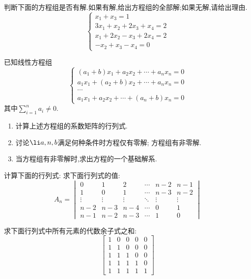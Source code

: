 \documentclass{ctexart}
\begin{document}
\pagestyle{empty}
\begin{center}
\end{center}
\begin{homework}[1(10')]
    判断下面的方程组是否有解.如果有解,给出方程组的全部解;如果无解,请给出理由.
    \[\left\{\begin{array}{l}
        x_1+x_3=1\\
        3x_1+x_2+2x_3+x_4=2\\
        x_1+2x_2-x_3+2x_4=2\\
        -x_2+x_3-x_4=0
    \end{array}\right.\]
\end{homework}
\begin{homework}[2(10')]
    已知线性方程组
    \[\left\{\begin{array}{c}
        \left(a_1+b\right)x_1+a_2x_2+\cdots+a_nx_n=0\\
        a_1x_1+\left(a_2+b\right)x_2+\cdots+a_nx_n=0\\
        \cdots\\
        a_1x_1+a_2x_2+\cdots+\left(a_n+b\right)x_n=0
    \end{array}\right.\]
    其中$\displaystyle\sum_{i=1}^{n}a_i\neq0$.
    \begin{enumerate}[label=\tbf{(\arabic*)},topsep=0pt,parsep=0pt,itemsep=0pt,partopsep=0pt]
        \item 计算上述方程组的系数矩阵的行列式.
        \item 讨论$\li a,n,b$满足何种条件时方程仅有零解; 方程组有非零解.
        \item 当方程组有非零解时,求出方程的一个基础解系.
    \end{enumerate}
\end{homework}
\begin{homework}[3(15')]
    计算下面的行列式:
    求下面行列式的值:
    \[A_n=\begin{vmatrix}
        0&1&2&\cdots&n-2&n-1\\
        1&0&1&\cdots&n-3&n-2\\
        \vdots&\vdots&\vdots&\ddots&\vdots&\vdots\\
        n-2&n-3&n-4&\cdots&0&1\\
        n-1&n-2&n-3&\cdots&1&0
    \end{vmatrix}\]
\end{homework}
\begin{homework}[4(13')]
    求下面行列式中所有元素的代数余子式之和:
    \[\begin{bmatrix}
        1&0&0&0&0\\
        1&1&0&0&0\\
        1&1&1&0&0\\
        1&1&1&1&0\\
        1&1&1&1&1
    \end{bmatrix}\]
\end{homework}
\end{document}

